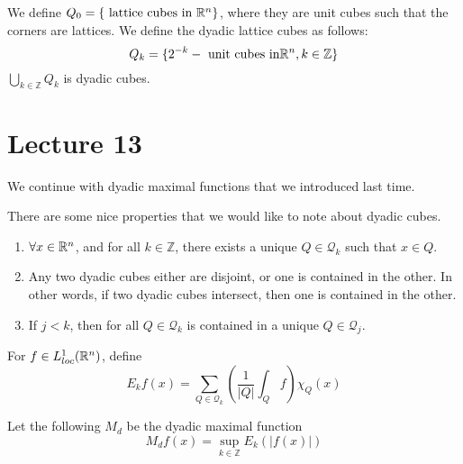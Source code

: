 \begin{definition}
    We define $Q_0=\{\text{ lattice cubes in } \mathbb{R}^n\}$, where they are unit cubes such that the corners are lattices. We define the dyadic lattice cubes as follows:
    \begin{equation*}
        Q_k=\{ 2^{-k}-\text{ unit cubes in} \mathbb{R}^n, k\in\mathbb{Z}\}
    \end{equation*}
    $\bigcup_{k\in\mathbb{Z}}Q_k$ is dyadic cubes.
\end{definition}

\section{Lecture 13}
We continue with dyadic maximal functions that we introduced last time.

There are some nice properties that we would like to note about dyadic cubes.
\begin{enumerate}
    \item $\forall x\in\mathbb{R}^n$, and for all $k\in\mathbb{Z}$, there exists a unique $Q\in\mathcal{Q}_k$ such that $x\in Q$.
    \item Any two dyadic cubes either are disjoint, or one is contained in the other. In other words, if two dyadic cubes intersect, then one is contained in the other.
    \item If $j<k$, then for all $Q\in\mathcal{Q}_k$ is contained in a unique $Q\in\mathcal{Q}_j$.
\end{enumerate}

\begin{definition}
    For $f\in L_{loc}^1(\mathbb{R}^n)$, define
    \begin{equation*}
        E_kf(x)=\sum_{Q\in \mathcal{Q}_k}\left(\frac{1}{|Q|}\int_Qf\right)\chi_{Q}(x)
    \end{equation*}
\end{definition}

\begin{definition}
    Let the following $M_d$ be the dyadic maximal function
    \begin{equation*}
        M_df(x)=\sup_{k\in\mathbb{Z}}E_k(|f(x)|)
    \end{equation*}
\end{definition}

